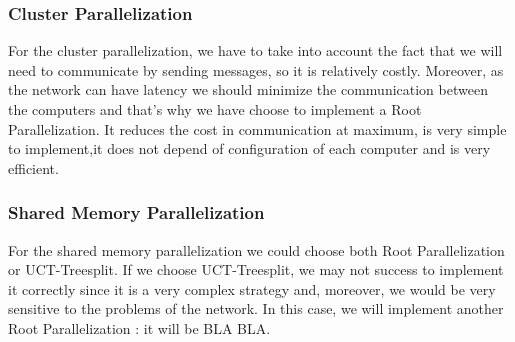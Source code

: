 \subsubsection{Cluster Parallelization}
For the cluster parallelization, we have to take into account the fact that we will need to communicate by sending messages, so it is relatively costly.
Moreover, as the network can have latency we should minimize the communication between the computers and that's why we have choose to implement a Root Parallelization.
It reduces the cost in communication at maximum, is very simple to implement,it does not depend of configuration of each computer and is very efficient.
\subsubsection{Shared Memory Parallelization}
For the shared memory parallelization we could choose both Root Parallelization or UCT-Treesplit.
If we choose UCT-Treesplit, we may not success to implement it correctly since it is a very complex strategy and, moreover, we would be very sensitive to the problems of the network. In this case, we will implement another Root Parallelization : it will be BLA BLA.
